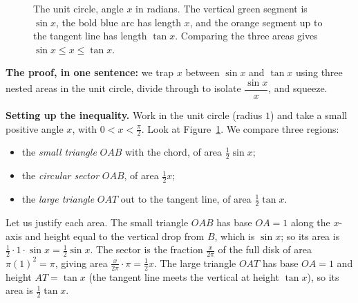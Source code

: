 \begin{figure}[h]
\centering
{}
\caption{The unit circle, angle $x$ in radians. The vertical green segment is
$\sin x$, the bold blue arc has length $x$, and the orange segment up to the
tangent line has length $\tan x$. Comparing the three areas gives
$\sin x \le x \le \tan x$.}
\label{ch07:fig-unitcircle}
\end{figure}

\begin{focusbox}
\textbf{The proof, in one sentence:} we trap $x$ between $\sin x$ and $\tan x$
using three nested areas in the unit circle, divide through to isolate
$\dfrac{\sin x}{x}$, and squeeze.
\end{focusbox}

\textbf{Setting up the inequality.} Work in the unit circle (radius $1$) and
take a small positive angle $x$, with $0 < x < \frac{\pi}{2}$. Look at
Figure~\ref{ch07:fig-unitcircle}. We compare three regions:
\begin{itemize}
  \item the \emph{small triangle} $OAB$ with the chord, of area $\tfrac12\sin x$;
  \item the \emph{circular sector} $OAB$, of area $\tfrac12 x$;
  \item the \emph{large triangle} $OAT$ out to the tangent line, of area $\tfrac12\tan x$.
\end{itemize}
Let us justify each area. The small triangle $OAB$ has base $OA=1$ along the
$x$-axis and height equal to the vertical drop from $B$, which is $\sin x$; so
its area is $\tfrac12\cdot 1\cdot \sin x = \tfrac12\sin x$. The sector is the
fraction $\tfrac{x}{2\pi}$ of the full disk of area $\pi(1)^2 = \pi$, giving
area $\tfrac{x}{2\pi}\cdot\pi = \tfrac12 x$. The large triangle $OAT$ has base
$OA=1$ and height $AT = \tan x$ (the tangent line meets the vertical at height
$\tan x$), so its area is $\tfrac12\tan x$.

